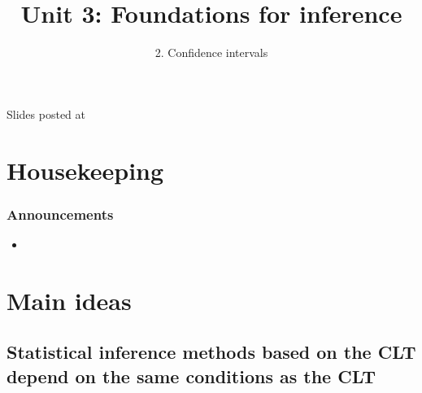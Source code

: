 \documentclass[slidestop,compress,mathserif,12pt,t,professionalfonts,xcolor=table]{beamer}
\title{Unit 3: Foundations for inference}
\subtitle{2. Confidence intervals}
\author{\CourseName}
\date{}
\institute{\InstituteName}
\begin{document}



\begin{frame}[plain]

\titlepage

\vfill

{\scriptsize {} \hfill Slides posted at  \webURL{\CourseSite}}

\addtocounter{framenumber}{-1} 

\end{frame}


\section{Housekeeping}


\begin{frame}
\frametitle{Announcements}

\begin{itemize}

\item 

\end{itemize}

\end{frame}


\section{Main ideas}

\subsection{Statistical inference methods based on the CLT depend on the same conditions as the CLT}
\label{mi1}

\end{document}

